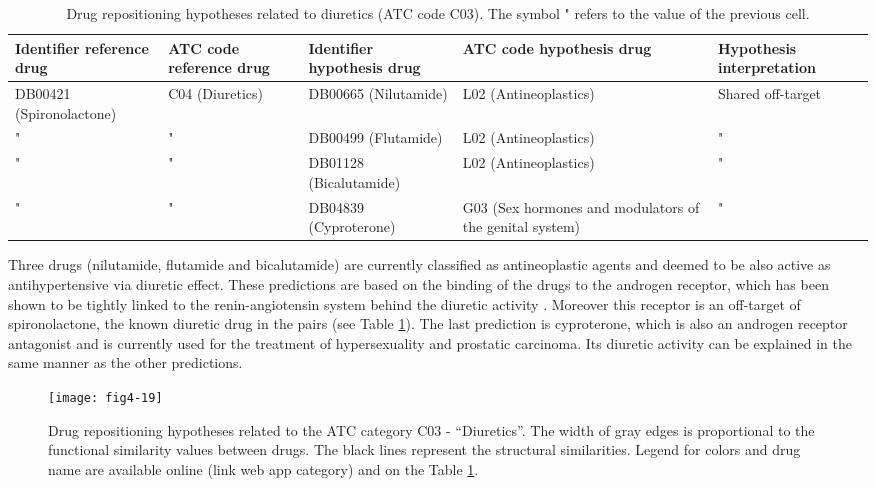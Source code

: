 \begin{table}[htbp]
\scriptsize
\begin{tabular}{|p{2cm}|p{2cm}|p{2cm}|p{3cm}|p{4cm}|}
\hline
\textbf{Identifier reference drug} & \textbf{ATC code reference drug} & \textbf{Identifier hypothesis drug} & \textbf{ATC code hypothesis drug} & \textbf{Hypothesis interpretation} \\ \hline
DB00421 (Spironolactone) & C04 (Diuretics) & DB00665 (Nilutamide) & L02 (Antineoplastics) & Shared off-target \\ \hline
" & " & DB00499 (Flutamide) & L02 (Antineoplastics) & " \\ \hline
" & " & DB01128 (Bicalutamide) & L02 (Antineoplastics) & " \\ \hline
" & " & DB04839 (Cyproterone) & G03 (Sex hormones and modulators of the genital system) & " \\ \hline
\end{tabular}
\caption{Drug repositioning hypotheses related to diuretics (ATC code C03). The symbol " refers to the value of the previous cell.}
\label{table:tablec03}
\end{table}

Three drugs (nilutamide, flutamide and bicalutamide) are currently classified as antineoplastic agents and deemed to be also active as antihypertensive via diuretic effect. These predictions are based on the binding of the drugs to the androgen receptor, which has been shown to be tightly linked to the renin-angiotensin system behind the diuretic activity \citep{ikeda2009androgen} \citep{hoshino2011regulation}. Moreover this receptor is an off-target of spironolactone, the known diuretic drug in the pairs (see Table \ref{table:tablec03}). The last prediction is cyproterone, which is also an androgen receptor antagonist and is currently used for the treatment of hypersexuality and prostatic carcinoma. Its diuretic activity can be explained in the same manner as the other predictions.

\begin{figure}[H]
    \centering
    \texttt{[image: fig4-19]}
    \caption{Drug repositioning hypotheses related to the ATC category C03 - “Diuretics”. The width of gray edges is proportional to the functional similarity values between drugs. The black lines represent the structural similarities. Legend for colors and drug name are available online (link web app category) and on the Table \ref{table:tablec03}.}
    \label{fig4-19}
\end{figure}

